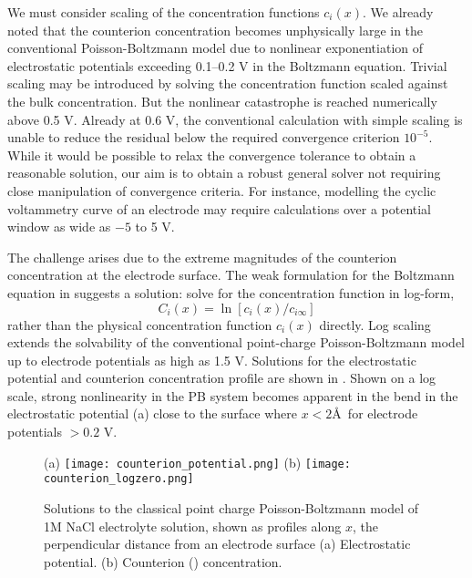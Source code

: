 We must consider scaling of the concentration functions $c_i(x)$. We
already noted that the counterion concentration becomes unphysically
large in the conventional Poisson-Boltzmann model due to nonlinear
exponentiation of  electrostatic potentials exceeding 0.1--0.2 V in
the Boltzmann equation. Trivial scaling may be introduced by solving
the concentration function scaled against the bulk concentration. But
 the nonlinear catastrophe is reached
numerically above 0.5 V. Already at 0.6 V, the conventional
calculation with simple scaling is unable to reduce the residual below
the required convergence criterion  $10^{-5}$. While it would be possible to relax the
convergence tolerance to obtain a reasonable solution, our aim is to
obtain a robust general solver not requiring close manipulation of
convergence criteria. For instance,  modelling the
cyclic voltammetry curve of an electrode may require calculations
over a potential window as wide as $-5$ to 5 V.

The challenge arises due to the extreme magnitudes of the counterion
concentration at the electrode surface. The weak formulation for the
Boltzmann equation in  suggests a solution:
solve for the concentration function in log-form,
\begin{equation}
C_{i}(x) = \ln[ c_{i}(x) / c_{i\infty}]
\label{log_scaling}
\end{equation}
rather than the physical concentration function $c_{i}(x)$ directly. Log
scaling extends the solvability of the conventional point-charge Poisson-Boltzmann
model up to electrode potentials as high as 1.5 V. Solutions for the
electrostatic potential and counterion concentration profile are shown
in . Shown on a log scale, strong
nonlinearity in the PB system becomes apparent in the bend in the
electrostatic potential (a) close to the
surface where $x<2$\AA\ for electrode potentials $> 0.2$ V.


\begin{figure}
\centering
(a)
\texttt{[image: counterion\_potential.png]}
(b)
\texttt{[image: counterion\_logzero.png]}
\caption{\label{fig_classical_PB}Solutions to the classical point
  charge Poisson-Boltzmann model of 1M NaCl electrolyte solution,
  shown as profiles along $x$, the perpendicular distance from an
  electrode surface (a) Electrostatic potential. (b) Counterion
  () concentration. }
\end{figure}

